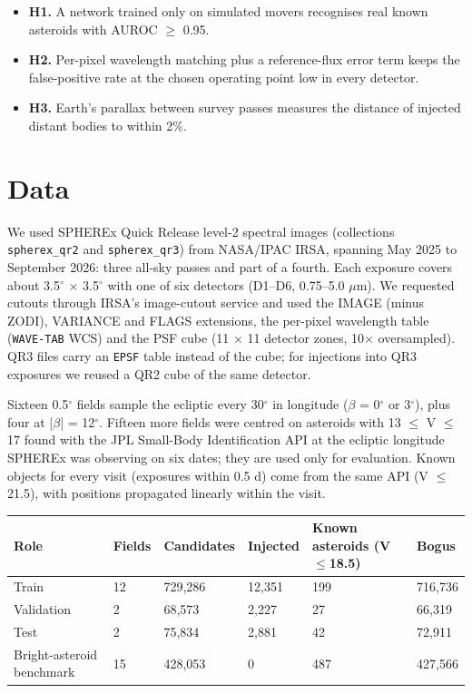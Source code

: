 \documentclass[twocolumn]{aastex631}
\begin{document}
\begin{itemize}
\item \textbf{H1.} A network trained only on simulated movers recognises real known asteroids with AUROC $\ge$ 0.95.
\item \textbf{H2.} Per-pixel wavelength matching plus a reference-flux error term keeps the false-positive rate at the chosen operating point low in every detector.
\item \textbf{H3.} Earth's parallax between survey passes measures the distance of injected distant bodies to within 2\%.
\end{itemize}

\section{Data}
\label{sec:data}
We used SPHEREx Quick Release level-2 spectral images (collections \texttt{spherex\_qr2} and \texttt{spherex\_qr3}) from NASA/IPAC IRSA, spanning May 2025 to September 2026: three all-sky passes and part of a fourth. Each exposure covers about 3.5$^\circ$ $\times$ 3.5$^\circ$ with one of six detectors (D1--D6, 0.75--5.0 $\mu$m). We requested cutouts through IRSA's image-cutout service and used the IMAGE (minus ZODI), VARIANCE and FLAGS extensions, the per-pixel wavelength table (\texttt{WAVE-TAB} WCS) and the PSF cube (11 $\times$ 11 detector zones, 10$\times$ oversampled). QR3 files carry an \texttt{EPSF} table instead of the cube; for injections into QR3 exposures we reused a QR2 cube of the same detector.

Sixteen 0.5$^\circ$ fields sample the ecliptic every 30$^\circ$ in longitude ($\beta$ = 0$^\circ$ or 3$^\circ$), plus four at |$\beta$| = 12$^\circ$. Fifteen more fields were centred on asteroids with 13 $\le$ V $\le$ 17 found with the JPL Small-Body Identification API at the ecliptic longitude SPHEREx was observing on six dates; they are used only for evaluation. Known objects for every visit (exposures within 0.5 d) come from the same API (V $\le$ 21.5), with positions propagated linearly within the visit.

\begin{table}[t]
\centering
\footnotesize

\begin{tabular}{llllll}
\hline\hline
Role & Fields & Candidates & Injected & Known asteroids (V$\le$18.5) & Bogus \\
\hline
Train & 12 & 729,286 & 12,351 & 199 & 716,736 \\
Validation & 2 & 68,573 & 2,227 & 27 & 66,319 \\
Test & 2 & 75,834 & 2,881 & 42 & 72,911 \\
Bright-asteroid benchmark & 15 & 428,053 & 0 & 487 & 427,566 \\
\hline
\end{tabular}
\end{table}
\end{document}
